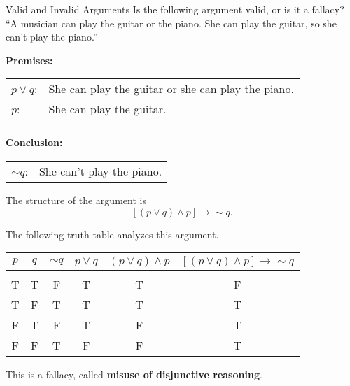\begin{example}[https://www.youtube.com/watch?v=uYJbdR7-uQU]{Valid and Invalid Arguments}
Is the following argument valid, or is it a fallacy?\\

``A musician can play the guitar or the piano.  She can play the guitar, so she can't play the piano.''

\sol
\textbf{Premises:}\\
\begin{tabular}{l l}
$p \vee q$: & She can play the guitar or she can play the piano.\\
$p$: & She can play the guitar.\\
& \\
\end{tabular}

\textbf{Conclusion:}\\
\begin{tabular}{l l}
$\sim q$: & She can't play the piano.
\end{tabular}

The structure of the argument is \[[(p \vee q) \wedge p] \to \sim q.\]
\vfill
\pagebreak

The following truth table analyzes this argument.
\begin{center}
\begin{tabular}{|c c c c c c|}
\hline
$p$ & $q$ & $\sim q$ & $p \vee q$ & $(p \vee q) \wedge p$ & $[(p \vee q) \wedge p] \to \sim q$\\
\hline
& & & & & \\
T & T & F & T & T & F\\
T & F & T & T & T & T\\
F & T & F & T & F & T\\
F & F & T & F & F & T\\
\hline
\end{tabular}
\end{center}

This is a fallacy, called \textbf{misuse of disjunctive reasoning}. 
\end{example}

